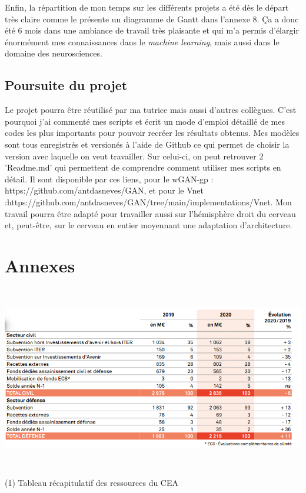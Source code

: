\documentclass[12pt, oneside, a4paper, titlepage]{article}
\begin{document}
Enfin, la répartition de mon temps sur les différents projets a été dès le départ très claire comme le présente un diagramme de Gantt dans l'annexe 8. Ça a donc été 6 mois dans une ambiance de travail très plaisante et qui m'a permis d'élargir énormément mes connaissances dans le \textit{machine learning}, mais aussi dans le domaine des neurosciences.

\subsection{Poursuite du projet}

Le projet pourra être réutilisé par ma tutrice mais aussi d'autres collègues. C'est pourquoi j'ai commenté mes scripts et écrit un mode d'emploi détaillé de mes codes les plus importants pour pouvoir recréer les résultats obtenus. Mes modèles sont tous enregistrés et versionés à l'aide de Github ce qui permet de choisir la version avec laquelle on veut travailler. Sur celui-ci, on peut retrouver 2 'Readme.md' qui permettent de comprendre comment utiliser mes scripts en détail. Il sont disponible par ces liens, pour le wGAN-gp : https://github.com/antdasneves/GAN, et pour le Vnet :https://github.com/antdasneves/GAN/tree/main/implementations/Vnet. Mon travail pourra être adapté pour travailler aussi sur l'hémisphère droit du cerveau et, peut-être, sur le cerveau en entier moyennant une adaptation d'architecture.


\newpage
\section{Annexes}

\vspace{2cm}

 \centerline{\includegraphics[width=15cm, height=8cm]{ressources.png}}
 \centerline{ (1) Tableau récapitulatif des ressources du CEA}
 \vspace{5mm} 
 
\end{document}

